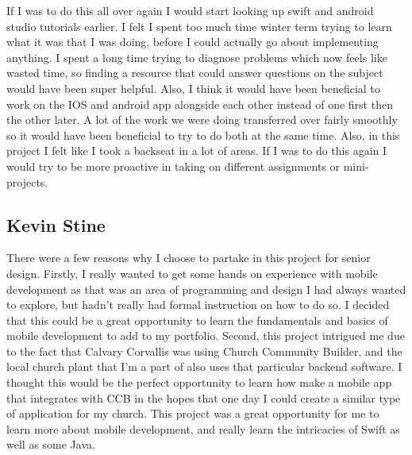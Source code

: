 \documentclass[letterpaper,10pt,draftclsnofoot,onecolumn,titlepage]{IEEEtran}
\begin{document}
	If I was to do this all over again I would start looking up swift and android studio tutorials earlier. 
I felt I spent too much time winter term trying to learn what it was that I was doing, before I could actually go about implementing anything. 
I spent a long time trying to diagnose problems which now feels like wasted time, so finding a resource that could answer questions on the subject would have been super helpful. 
Also, I think it would have been beneficial to work on the IOS and android app alongside each other instead of one first then the other later. 
A lot of the work we were doing transferred over fairly smoothly so it would have been beneficial to try to do both at the same time. 
Also, in this project I felt like I took a backseat in a lot of areas. 
If I was to do this again I would try to be more proactive in taking on different assignments or mini-projects. 



	\subsection{Kevin Stine}
		There were a few reasons why I choose to partake in this project for senior design.
		Firstly, I really wanted to get some hands on experience with mobile development as that was an area of programming and design I had always wanted to explore, but hadn't really had formal instruction on how to do so.
		I decided that this could be a great opportunity to learn the fundamentals and basics of mobile development to add to my portfolio.
		Second, this project intrigued me due to the fact that Calvary Corvallis was using Church Community Builder, and the local church plant that I'm a part of also uses that particular backend software.
		I thought this would be the perfect opportunity to learn how make a mobile app that integrates with CCB in the hopes that one day I could create a similar type of application for my church.
		This project was a great opportunity for me to learn more about mobile development, and really learn the intricacies of Swift as well as some Java.
\end{document}
